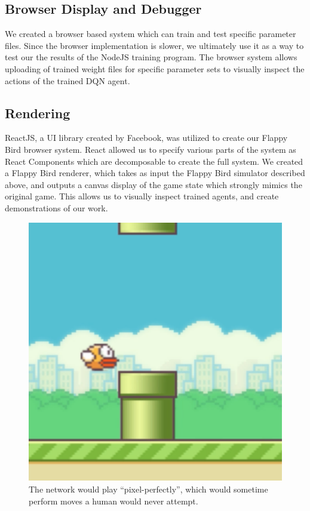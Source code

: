 \documentclass{chi2009}
\begin{document}
\subsection{Browser Display and Debugger}

We created a browser based system which can train and test specific parameter files. Since the browser implementation is slower, we ultimately use it as a way to test our the results of the NodeJS training program. The browser system allows uploading of trained weight files for specific parameter sets to visually inspect the actions of the trained DQN agent.

\subsection{Rendering}

ReactJS, a UI library created by Facebook, was utilized to create our Flappy Bird browser system. React allowed us to specify various parts of the system as React Components which are decomposable to create the full system. We created a Flappy Bird renderer, which takes as input the Flappy Bird simulator described above, and outputs a canvas display of the game state which strongly mimics the original game. This allows us to visually inspect trained agents, and create demonstrations of our work.

\begin{figure}[t]
\begin{center}
\includegraphics[width=0.8\columnwidth]{figs/close.png}
\vspace*{-0.09in}
\caption{The network would play ``pixel-perfectly'', which would sometime perform moves a human would never attempt.}
\label{fig:close}
\end{center}
\end{figure}
\end{document}
